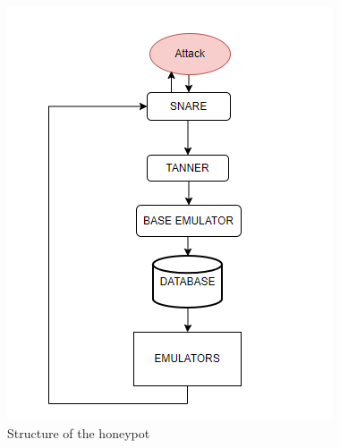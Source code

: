 \begin{figure}[h!]
\centering
\includegraphics{images/solution.png}
\caption{Structure of the honeypot}
\label{fig:irradiances}
\end{figure}
\FloatBarrier
